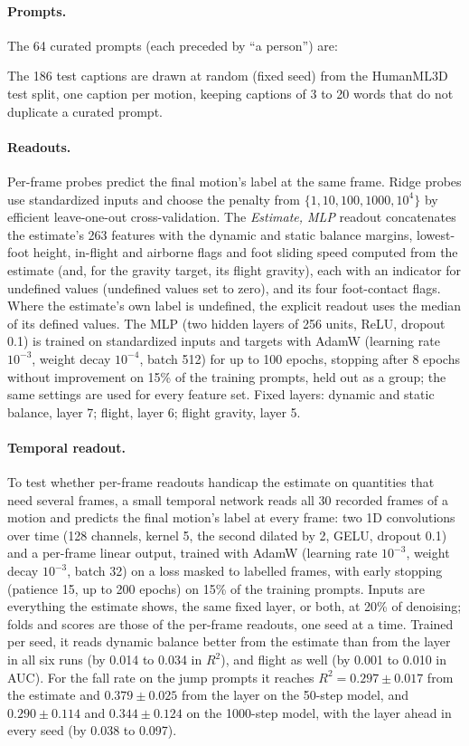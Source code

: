 \paragraph{Prompts.} The 64 curated prompts (each preceded by ``a person'') are:

The 186 test captions are drawn at random (fixed seed) from the HumanML3D test split, one caption per motion, keeping captions of 3 to 20 words that do not duplicate a curated prompt.

\paragraph{Readouts.} Per-frame probes predict the final motion's label at the same frame. Ridge probes use standardized inputs and choose the penalty from $\{1, 10, 100, 1000, 10^4\}$ by efficient leave-one-out cross-validation. The \emph{Estimate, MLP} readout concatenates the estimate's 263 features with the dynamic and static balance margins, lowest-foot height, in-flight and airborne flags and foot sliding speed computed from the estimate (and, for the gravity target, its flight gravity), each with an indicator for undefined values (undefined values set to zero), and its four foot-contact flags. Where the estimate's own label is undefined, the explicit readout uses the median of its defined values. The MLP (two hidden layers of 256 units, ReLU, dropout 0.1) is trained on standardized inputs and targets with AdamW (learning rate $10^{-3}$, weight decay $10^{-4}$, batch 512) for up to 100 epochs, stopping after 8 epochs without improvement on 15\% of the training prompts, held out as a group; the same settings are used for every feature set. Fixed layers: dynamic and static balance, layer 7; flight, layer 6; flight gravity, layer 5.

\paragraph{Temporal readout.} To test whether per-frame readouts handicap the estimate on quantities that need several frames, a small temporal network reads all 30 recorded frames of a motion and predicts the final motion's label at every frame: two 1D convolutions over time (128 channels, kernel 5, the second dilated by 2, GELU, dropout 0.1) and a per-frame linear output, trained with AdamW (learning rate $10^{-3}$, weight decay $10^{-3}$, batch 32) on a loss masked to labelled frames, with early stopping (patience 15, up to 200 epochs) on 15\% of the training prompts. Inputs are everything the estimate shows, the same fixed layer, or both, at 20\% of denoising; folds and scores are those of the per-frame readouts, one seed at a time. Trained per seed, it reads dynamic balance better from the estimate than from the layer in all six runs (by 0.014 to 0.034 in $R^2$), and flight as well (by 0.001 to 0.010 in AUC). For the fall rate on the jump prompts it reaches $R^2 = 0.297 \pm 0.017$ from the estimate and $0.379 \pm 0.025$ from the layer on the 50-step model, and $0.290 \pm 0.114$ and $0.344 \pm 0.124$ on the 1000-step model, with the layer ahead in every seed (by 0.038 to 0.097).

